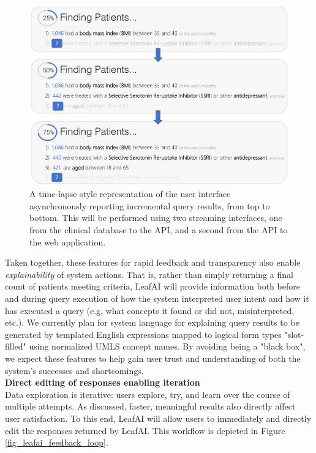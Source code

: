 \documentclass[../main.tex]{subfiles}
\begin{document}
\begin{figure}[h!]
  \centering
  \includegraphics[scale=0.5]{Figures/8_future_work/leafai_query_progress.pdf}  
  \caption{A time-lapse style representation of the user interface asynchronously reporting incremental query results, from top to bottom. This will be performed using two streaming interfaces, one from the clinical database to the API, and a second from the API to the web application.}
\label{fig_leafai_query_progress}
\end{figure}

Taken together, these features for rapid feedback and transparency also enable \textit{explainability} of system actions. That is, rather than simply returning a final count of patients meeting criteria, LeafAI will provide information both before and during query execution of how the system interpreted user intent and how it has executed a query (e.g. what concepts it found or did not, misinterpreted, etc.). We currently plan for system language for explaining query results to be generated by templated English expressions mapped to logical form types "slot-filled" using normalized UMLS concept names. By avoiding being a "black box", we expect these features to help gain user trust and understanding of both the system's successes and shortcomings. \\

\noindent \textbf{Direct editing of responses enabling iteration} \\
Data exploration is iterative: users explore, try, and learn over the course of multiple attempts. As discussed, faster, meaningful results also directly affect user satisfaction. To this end, LeafAI will allow users to immediately and directly edit the responses returned by LeafAI. This workflow is depicted in Figure \ref{fig_leafai_feedback_loop}. 
\end{document}
